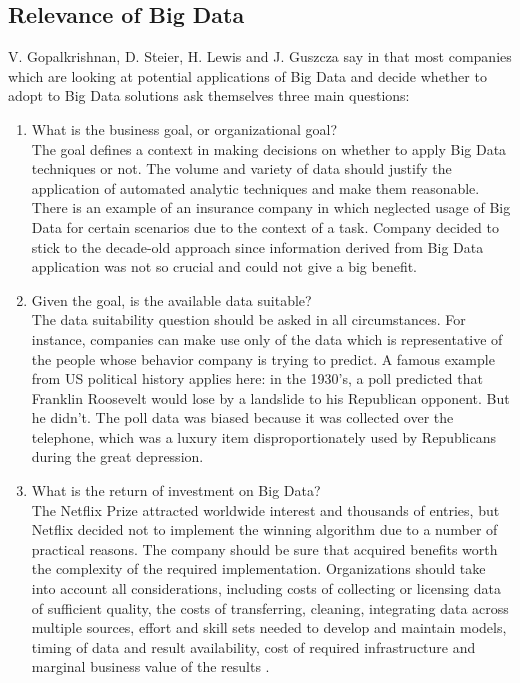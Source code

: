 \documentclass[runningheads]{llncs}
\begin{document}
\subsection{Relevance of Big Data}
V. Gopalkrishnan, D. Steier, H. Lewis and J. Guszcza say in \cite{Gopalkrishnan} that most companies which are looking at potential applications of Big Data and decide whether to adopt to Big Data solutions ask themselves three main questions:
\begin{enumerate}
\item What is the business goal, or organizational goal?\\

The goal defines a context in making decisions on whether to apply Big Data techniques or not. The volume and variety of data should justify the application of automated analytic techniques and make them reasonable. There is an example of an insurance company in \cite{Gopalkrishnan} which neglected usage of Big Data for certain scenarios due to the context of a task. Company decided to stick to the decade-old approach since information derived from Big Data application was not so crucial and could not give a big benefit.\\ 
\item Given the goal, is the available data suitable?\\ 

The data suitability question should be asked in all circumstances. For instance, companies can make use only of the data which is representative of the people whose behavior company is trying to predict. A famous example from US political history applies here: in the 1930's, a poll predicted that Franklin Roosevelt would lose by a landslide to his Republican opponent. But he didn't. The poll data was biased because it was collected over the telephone, which was a luxury item disproportionately used by Republicans during the great depression.\\

\item What is the return of investment on Big Data?\\

The Netflix Prize attracted worldwide interest and thousands of entries, but Netflix decided not to implement the winning algorithm \cite{NETFLIX} due to a number of practical reasons. The company should be sure that acquired benefits worth the complexity of the required implementation. Organizations should take into account all considerations, including costs of collecting or licensing data of sufficient quality, the costs of transferring, cleaning, integrating data across multiple sources, effort and skill sets needed to develop and maintain models, timing of data and result availability, cost of required infrastructure and marginal business value of the results \cite{Gopalkrishnan}.
\end{enumerate}
\end{document}
